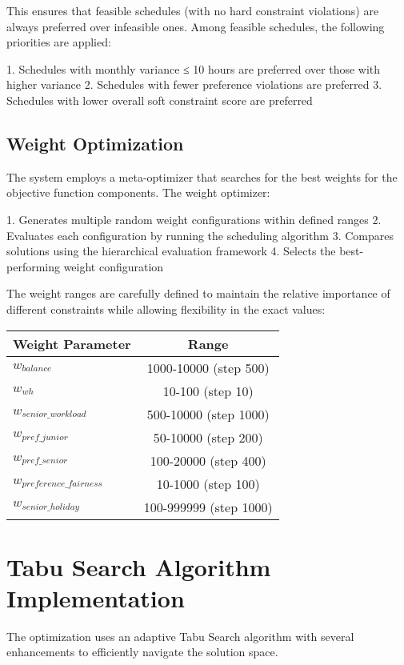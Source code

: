 \documentclass[12pt]{article}
\begin{document}
This ensures that feasible schedules (with no hard constraint violations) are always preferred over infeasible ones. Among feasible schedules, the following priorities are applied:

1. Schedules with monthly variance ≤ 10 hours are preferred over those with higher variance
2. Schedules with fewer preference violations are preferred
3. Schedules with lower overall soft constraint score are preferred

\subsection{Weight Optimization}

The system employs a meta-optimizer that searches for the best weights for the objective function components. The weight optimizer:

1. Generates multiple random weight configurations within defined ranges
2. Evaluates each configuration by running the scheduling algorithm
3. Compares solutions using the hierarchical evaluation framework
4. Selects the best-performing weight configuration

The weight ranges are carefully defined to maintain the relative importance of different constraints while allowing flexibility in the exact values:

\begin{center}
\begin{tabular}{|l|c|}
\hline
\textbf{Weight Parameter} & \textbf{Range} \\
\hline
$w_{balance}$ & 1000-10000 (step 500) \\
$w_{wh}$ & 10-100 (step 10) \\
$w_{senior\_workload}$ & 500-10000 (step 1000) \\
$w_{pref\_junior}$ & 50-10000 (step 200) \\
$w_{pref\_senior}$ & 100-20000 (step 400) \\
$w_{preference\_fairness}$ & 10-1000 (step 100) \\
$w_{senior\_holiday}$ & 100-999999 (step 1000) \\
\hline
\end{tabular}
\end{center}

\section{Tabu Search Algorithm Implementation}

The optimization uses an adaptive Tabu Search algorithm with several enhancements to efficiently navigate the solution space.
\end{document}
